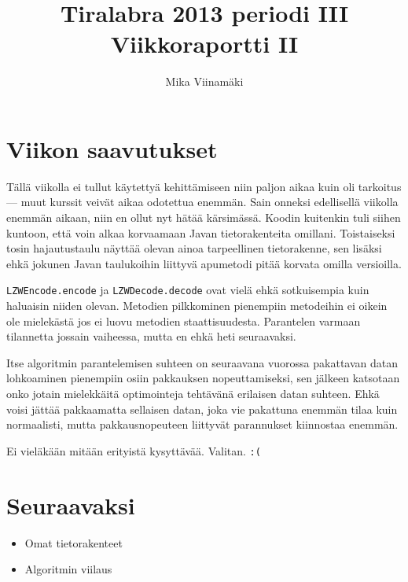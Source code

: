 \documentclass{article}
\begin{document}
\title{Tiralabra 2013 periodi III \\ Viikkoraportti II}
\author{Mika Viinamäki}
\maketitle

\section{Viikon saavutukset}

Tällä viikolla ei tullut käytettyä kehittämiseen niin paljon aikaa kuin oli tarkoitus --- muut kurssit veivät aikaa odotettua enemmän. Sain onneksi edellisellä viikolla enemmän aikaan, niin en ollut nyt hätää kärsimässä. Koodin kuitenkin tuli siihen kuntoon, että voin alkaa korvaamaan Javan tietorakenteita omillani. Toistaiseksi tosin hajautustaulu näyttää olevan ainoa tarpeellinen tietorakenne, sen lisäksi ehkä jokunen Javan taulukoihin liittyvä apumetodi pitää korvata omilla versioilla.

\texttt{LZWEncode.encode} ja \texttt{LZWDecode.decode} ovat vielä ehkä sotkuisempia kuin haluaisin niiden olevan. Metodien pilkkominen pienempiin metodeihin ei oikein ole mielekästä jos ei luovu metodien staattisuudesta. Parantelen varmaan tilannetta jossain vaiheessa, mutta en ehkä heti seuraavaksi.

Itse algoritmin parantelemisen suhteen on seuraavana vuorossa pakattavan datan lohkoaminen pienempiin osiin pakkauksen nopeuttamiseksi, sen jälkeen katsotaan onko jotain mielekkäitä optimointeja tehtävänä erilaisen datan suhteen. Ehkä voisi jättää pakkaamatta sellaisen datan, joka vie pakattuna enemmän tilaa kuin normaalisti, mutta pakkausnopeuteen liittyvät parannukset kiinnostaa enemmän.

Ei vieläkään mitään erityistä kysyttävää. Valitan. \texttt{:(}

\section{Seuraavaksi}

\begin{itemize}
    \item Omat tietorakenteet
    \item Algoritmin viilaus
\end{itemize}
\end{document}
